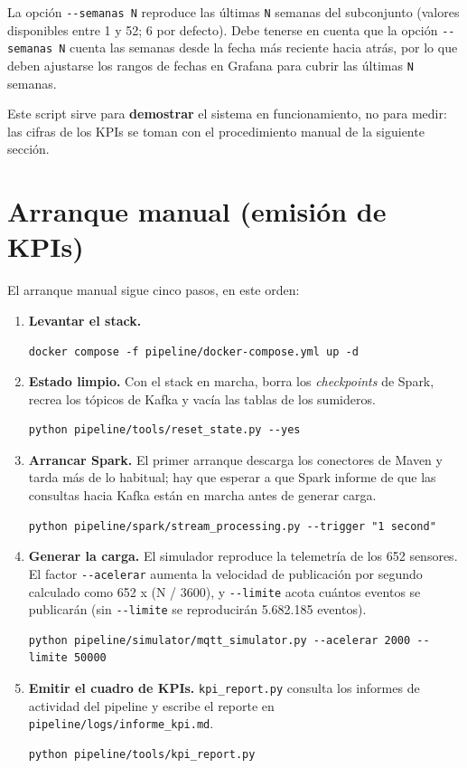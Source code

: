 La opción \texttt{-{}-semanas N} reproduce las últimas \texttt{N} semanas del subconjunto (valores disponibles entre 1 y 52; 6 por defecto). Debe tenerse en cuenta que la opción \texttt{-{}-semanas N} cuenta las semanas desde la fecha más reciente hacia atrás, por lo que deben ajustarse los rangos de fechas en Grafana para cubrir las últimas \texttt{N} semanas.

Este script sirve para \textbf{demostrar} el sistema en funcionamiento, no para medir: las cifras de los KPIs se toman con el procedimiento manual de la siguiente sección.

\section{Arranque manual (emisión de KPIs)}
\label{sec:ejec-manual}

El arranque manual sigue cinco pasos, en este orden:

\begin{enumerate}
  \item \textbf{Levantar el stack.}
  {\footnotesize
  \begin{verbatim}
docker compose -f pipeline/docker-compose.yml up -d
  \end{verbatim}
  }

  \item \textbf{Estado limpio.} Con el stack en marcha, borra los \textit{checkpoints} de Spark, recrea los tópicos de Kafka y vacía las tablas de los sumideros.
  {\footnotesize
  \begin{verbatim}
python pipeline/tools/reset_state.py --yes
  \end{verbatim}
  }

  \item \textbf{Arrancar Spark.} El primer arranque descarga los conectores de Maven y tarda más de lo habitual; hay que esperar a que Spark informe de que las consultas hacia Kafka están en marcha antes de generar carga.
  {\footnotesize
  \begin{verbatim}
python pipeline/spark/stream_processing.py --trigger "1 second"
  \end{verbatim}
  }

  \item \textbf{Generar la carga.} El simulador reproduce la telemetría de los 652 sensores. El factor \texttt{-{}-acelerar} aumenta la velocidad de publicación por segundo calculado como 652 x (N / 3600), y \texttt{-{}-limite} acota cuántos eventos se publicarán (sin \texttt{-{}-limite} se reproducirán 5.682.185 eventos).
  {\footnotesize
  \begin{verbatim}
python pipeline/simulator/mqtt_simulator.py --acelerar 2000 --limite 50000
  \end{verbatim}
  }

  \item \textbf{Emitir el cuadro de KPIs.} \texttt{kpi\_report.py} consulta los informes de actividad del pipeline y escribe el reporte en \texttt{pipeline/logs/informe\_kpi.md}.
  {\footnotesize
  \begin{verbatim}
python pipeline/tools/kpi_report.py
  \end{verbatim}
  }
\end{enumerate}

